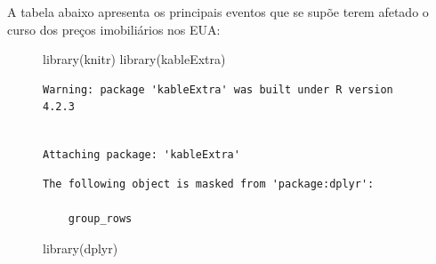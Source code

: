 \documentclass[
  portuguese,
  letterpaper,
  DIV=11,
  numbers=noendperiod,
  oneside]{scrartcl}
\newenvironment{Shaded}{\begin{snugshade}}{\end{snugshade}}
\newcommand{\FunctionTok}[1]{\textcolor[rgb]{0.28,0.35,0.67}{#1}}
\newcommand{\NormalTok}[1]{\textcolor[rgb]{0.00,0.23,0.31}{#1}}
\begin{document}
A tabela abaixo apresenta os principais eventos que se supõe terem
afetado o curso dos preços imobiliários nos EUA:

\begin{figure}

\begin{Shaded}
\begin{Highlighting}[]
\FunctionTok{library}\NormalTok{(knitr)}
\FunctionTok{library}\NormalTok{(kableExtra)}
\end{Highlighting}
\end{Shaded}

\begin{verbatim}
Warning: package 'kableExtra' was built under R version 4.2.3
\end{verbatim}

\begin{verbatim}

Attaching package: 'kableExtra'
\end{verbatim}

\begin{verbatim}
The following object is masked from 'package:dplyr':

    group_rows
\end{verbatim}

\begin{Shaded}
\begin{Highlighting}[]
\FunctionTok{library}\NormalTok{(dplyr)}


\end{Highlighting}
\end{Shaded}
\end{figure}
\end{document}
